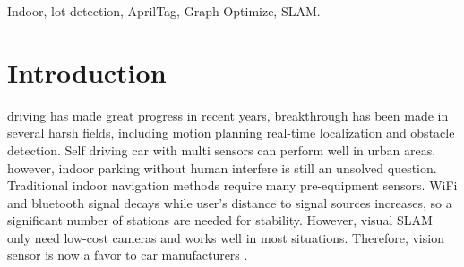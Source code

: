 \documentclass[journal]{IEEEtran}
\begin{document}
\begin{IEEEkeywords}
Indoor, lot detection, AprilTag, Graph Optimize, SLAM.
\end{IEEEkeywords}






%
\IEEEpeerreviewmaketitle



\section{Introduction}
% 
% 
% 
% 


 driving has made great progress in recent years, breakthrough has been made in several harsh fields, including motion planning real-time localization and obstacle detection. Self driving car with multi sensors can perform well in urban areas. however, indoor parking without human interfere is still an unsolved question. Traditional indoor navigation methods require many pre-equipment sensors. WiFi and bluetooth signal decays while user’s distance to signal sources increases, so a significant number of stations are needed for stability. However, visual SLAM only need low-cost cameras and works well in most situations. Therefore, vision sensor is now a favor to car manufacturers . 
\end{document}
